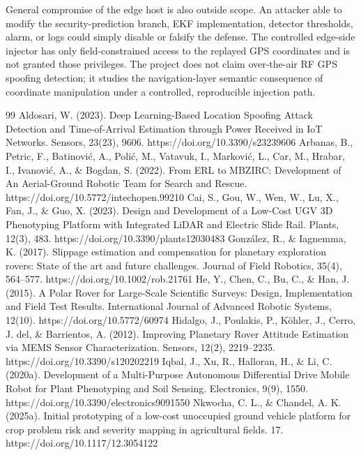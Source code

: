\documentclass[11pt,a4paper]{article}
\begin{document}
General compromise of the edge host is also outside scope. An attacker able to modify the security-prediction branch, EKF implementation, detector thresholds, alarm, or logs could simply disable or falsify the defense. The controlled edge-side injector has only field-constrained access to the replayed GPS coordinates and is not granted those privileges. The project does not claim over-the-air RF GPS spoofing detection; it studies the navigation-layer semantic consequence of coordinate manipulation under a controlled, reproducible injection path.


\begin{thebibliography}{99}
 Aldosari, W. (2023). Deep Learning-Based Location Spoofing Attack Detection and Time-of-Arrival Estimation through Power Received in IoT Networks. Sensors, 23(23), 9606. https://doi.org/10.3390/s23239606
 Arbanas, B., Petric, F., Batinović, A., Polić, M., Vatavuk, I., Marković, L., Car, M., Hrabar, I., Ivanović, A., \& Bogdan, S. (2022). From ERL to MBZIRC: Development of An Aerial-Ground Robotic Team for Search and Rescue. https://doi.org/10.5772/intechopen.99210
 Cai, S., Gou, W., Wen, W., Lu, X., Fan, J., \& Guo, X. (2023). Design and Development of a Low-Cost UGV 3D Phenotyping Platform with Integrated LiDAR and Electric Slide Rail. Plants, 12(3), 483. https://doi.org/10.3390/plants12030483
 González, R., \& Iagnemma, K. (2017). Slippage estimation and compensation for planetary exploration rovers: State of the art and future challenges. Journal of Field Robotics, 35(4), 564–577. https://doi.org/10.1002/rob.21761
 He, Y., Chen, C., Bu, C., \& Han, J. (2015). A Polar Rover for Large-Scale Scientific Surveys: Design, Implementation and Field Test Results. International Journal of Advanced Robotic Systems, 12(10). https://doi.org/10.5772/60974
 Hidalgo, J., Poulakis, P., Köhler, J., Cerro, J. del, \& Barrientos, A. (2012). Improving Planetary Rover Attitude Estimation via MEMS Sensor Characterization. Sensors, 12(2), 2219–2235. https://doi.org/10.3390/s120202219
 Iqbal, J., Xu, R., Halloran, H., \& Li, C. (2020a). Development of a Multi-Purpose Autonomous Differential Drive Mobile Robot for Plant Phenotyping and Soil Sensing. Electronics, 9(9), 1550. https://doi.org/10.3390/electronics9091550
 Nkwocha, C. L., \& Chandel, A. K. (2025a). Initial prototyping of a low-cost unoccupied ground vehicle platform for crop problem risk and severity mapping in agricultural fields. 17. https://doi.org/10.1117/12.3054122

\end{thebibliography}
\end{document}
